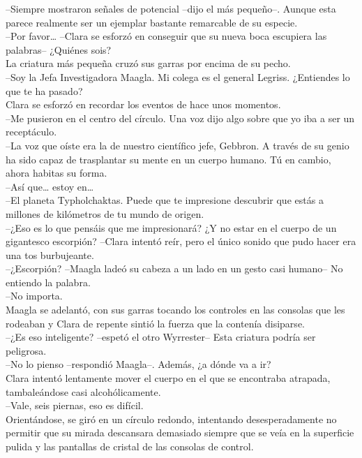 --Siempre mostraron señales de potencial --dijo el más pequeño--. Aunque
esta parece realmente ser un ejemplar bastante remarcable de su
especie.\\
--Por favor\ldots{} --Clara se esforzó en conseguir que su nueva boca
escupiera las palabras-- ¿Quiénes sois?\\
La criatura más pequeña cruzó sus garras por encima de su pecho.\\
--Soy la Jefa Investigadora Maagla. Mi colega es el general Legriss.
¿Entiendes lo que te ha pasado?\\
Clara se esforzó en recordar los eventos de hace unos momentos.\\
--Me pusieron en el centro del círculo. Una voz dijo algo sobre que yo
iba a ser un receptáculo.\\
--La voz que oíste era la de nuestro científico jefe, Gebbron. A través
de su genio ha sido capaz de trasplantar su mente en un cuerpo humano.
Tú en cambio, ahora habitas su forma.\\
--Así que\ldots{} estoy en\ldots{}\\
--El planeta Typholchaktas. Puede que te impresione descubrir que estás
a millones de kilómetros de tu mundo de origen.\\
--¿Eso es lo que pensáis que me impresionará? ¿Y no estar en el cuerpo
de un gigantesco escorpión? --Clara intentó reír, pero el único sonido
que pudo hacer era una tos burbujeante.\\
--¿Escorpión? --Maagla ladeó su cabeza a un lado en un gesto casi
humano-- No entiendo la palabra.\\
--No importa.\\
Maagla se adelantó, con sus garras tocando los controles en las consolas
que les rodeaban y Clara de repente sintió la fuerza que la contenía
disiparse.\\
--¿Es eso inteligente? --espetó el otro Wyrrester-- Esta criatura podría
ser peligrosa.\\
--No lo pienso --respondió Maagla--. Además, ¿a dónde va a ir?\\
Clara intentó lentamente mover el cuerpo en el que se encontraba
atrapada, tambaleándose casi alcohólicamente.\\
--Vale, seis piernas, eso es difícil.\\
Orientándose, se giró en un círculo redondo, intentando desesperadamente
no permitir que su mirada descansara demasiado siempre que se veía en la
superficie pulida y las pantallas de cristal de las consolas de
control.\\
